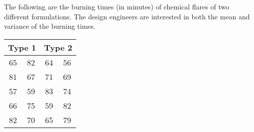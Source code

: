 \documentclass[../main.tex]{subfiles}
\begin{document}

The following are the burning times (in minutes) of chemical flares of two different formulations.
The design engineers are interested in both the mean and variance of the burning times.

\begin{table}[ht]
    \centering
    \begin{tabular}{cccc}
    \toprule
    \multicolumn{2}{c}{\textbf{Type 1}} & \multicolumn{2}{c}{\textbf{Type 2}} \\ \midrule
    65     & 82    & 64    & 56    \\ 
    81     & 67    & 71    & 69    \\ 
    57     & 59    & 83    & 74    \\ 
    66     & 75    & 59    & 82    \\ 
    82     & 70    & 65    & 79    \\ \toprule
    \end{tabular}
\end{table}
\end{document}
